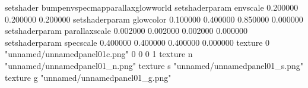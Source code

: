 setshader bumpenvspecmapparallaxglowworld
setshaderparam envscale 0.200000 0.200000 0.200000
setshaderparam glowcolor 0.100000 0.400000 0.850000 0.000000
setshaderparam parallaxscale 0.002000 0.002000 0.002000 0.000000
setshaderparam specscale 0.400000 0.400000 0.400000 0.000000
texture 0 "unnamed/unnamedpanel01c.png" 0 0 0 1
texture n "unnamed/unnamedpanel01_n.png"
texture s "unnamed/unnamedpanel01_s.png"
texture g "unnamed/unnamedpanel01_g.png"